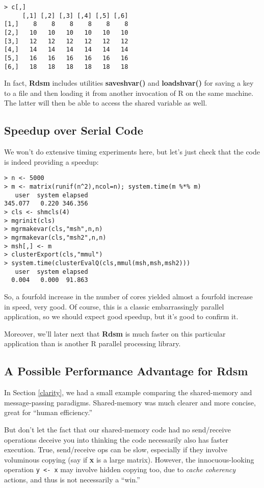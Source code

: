 \documentclass[11pt]{article}
\begin{document}
\begin{lstlisting}
> c[,]
     [,1] [,2] [,3] [,4] [,5] [,6]
[1,]    8    8    8    8    8    8
[2,]   10   10   10   10   10   10
[3,]   12   12   12   12   12   12
[4,]   14   14   14   14   14   14
[5,]   16   16   16   16   16   16
[6,]   18   18   18   18   18   18
\end{lstlisting}

In fact, {\bf Rdsm} includes utilities {\bf saveshvar()} and {\bf
loadshvar()} for saving a key to a file and then loading it from another
invocation of R on the same machine.  The latter will then be able to
access the shared variable as well.

\subsection{Speedup over Serial Code}

We won't do extensive timing experiments here, but let's just check that
the code is indeed providing a speedup:

\begin{lstlisting}
> n <- 5000
> m <- matrix(runif(n^2),ncol=n); system.time(m %*% m)
   user  system elapsed
345.077   0.220 346.356
> cls <- shmcls(4)
> mgrinit(cls)
> mgrmakevar(cls,"msh",n,n)
> mgrmakevar(cls,"msh2",n,n)
> msh[,] <- m
> clusterExport(cls,"mmul")
> system.time(clusterEvalQ(cls,mmul(msh,msh,msh2)))
   user  system elapsed
  0.004   0.000  91.863
\end{lstlisting}

So, a fourfold increase in the number of cores yielded almost a
fourfold increase in speed, very good.  Of course, this is a classic
embarrassingly parallel application, so we should expect good speedup,
but it's good to confirm it.  

Moreover, we'll later next that {\bf Rdsm} is much faster on this
particular application than is another R parallel processing library.

\subsection{A Possible Performance Advantage for Rdsm}
\label{adshared}

In Section \ref{clarity}, we had a small example comparing the
shared-memory and message-passing paradigms.  Shared-memory was much
clearer and more concise, great for ``human efficiency.''

But don't let the fact that our shared-memory code had no send/receive
operations deceive you into thinking the code necessarily also has
faster execution.  True, send/receive ops can be slow, especially if
they involve voluminous copying (say if {\bf x} is a large matrix).
However, the innocuous-looking operation \lstinline{y <- x} may involve
hidden copying too, due to {\it cache coherency} actions, and thus is
not necessarily a ``win.''
\end{document}
